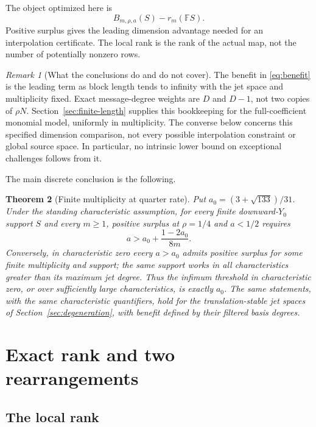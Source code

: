 \documentclass[11pt]{article}
\newtheorem{theorem}{Theorem}[section]
\theoremstyle{remark}\newtheorem{remark}[theorem]{Remark}
\begin{document}
The object optimized here is
\begin{equation}\label{eq:surplus}
 B_{m,\rho,a}(S)-r_m(\mathbb F S).
\end{equation}
Positive surplus gives the leading dimension advantage needed for an interpolation certificate. The local rank is the rank of the actual map, not the number of potentially nonzero rows.

\begin{remark}[What the conclusions do and do not cover]
The benefit in \eqref{eq:benefit} is the leading term as block length tends to infinity with the jet space and multiplicity fixed. Exact message-degree weights are $D$ and $D-1$, not two copies of $\rho N$. Section~\ref{sec:finite-length} supplies this bookkeeping for the full-coefficient monomial model, uniformly in multiplicity. The converse below concerns this specified dimension comparison, not every possible interpolation constraint or global source space. In particular, no intrinsic lower bound on exceptional challenges follows from it.
\end{remark}

The main discrete conclusion is the following.
\begin{theorem}[Finite multiplicity at quarter rate]\label{thm:quarter}
Put $a_0=(3+\sqrt{133})/31$. Under the standing characteristic assumption, for every finite downward-$Y_0$ support $S$ and every $m\ge1$, positive surplus at $\rho=1/4$ and $a<1/2$ requires
\[
 a>a_0+\frac{1-2a_0}{8m}.
\]
Conversely, in characteristic zero every $a>a_0$ admits positive surplus for some finite multiplicity and support; the same support works in all characteristics greater than its maximum jet degree. Thus the infimum threshold in characteristic zero, or over sufficiently large characteristics, is exactly $a_0$.
The same statements, with the same characteristic quantifiers, hold for the translation-stable jet spaces of Section~\ref{sec:degeneration}, with benefit defined by their filtered basis degrees.
\end{theorem}

\section{Exact rank and two rearrangements}

\subsection{The local rank}
\end{document}
